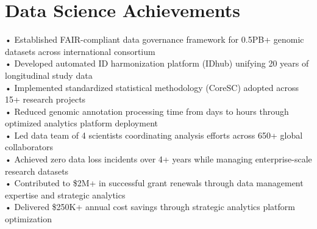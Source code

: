 \documentclass[letterpaper,11pt]{article}
\begin{document}
\section{Data Science Achievements}
 \begin{itemize}[leftmargin=0.15in, label={}]
    \small{\item{
     • Established FAIR-compliant data governance framework for 0.5PB+ genomic datasets across international consortium \\
     • Developed automated ID harmonization platform (IDhub) unifying 20 years of longitudinal study data \\
     • Implemented standardized statistical methodology (CoreSC) adopted across 15+ research projects \\
     • Reduced genomic annotation processing time from days to hours through optimized analytics platform deployment \\
     • Led data team of 4 scientists coordinating analysis efforts across 650+ global collaborators \\
     • Achieved zero data loss incidents over 4+ years while managing enterprise-scale research datasets \\
     • Contributed to \$2M+ in successful grant renewals through data management expertise and strategic analytics \\
     • Delivered \$250K+ annual cost savings through strategic analytics platform optimization
    }}
 \end{itemize}

\end{document}
